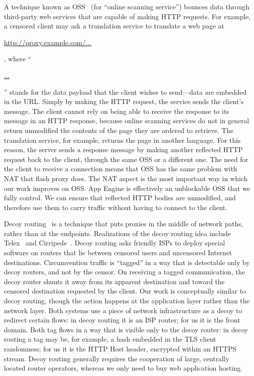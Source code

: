 \documentclass{article}
\begin{document}

A technique known as OSS~\cite{oss} (for
``online scanning service'') bounces data
through third-party web services that are capable of making HTTP requests.
For example, a censored client may ask a translation service to
translate a web page at \begin{NoHyper}\url{http://proxy.example.com/...}\end{NoHyper},
where ``\begin{NoHyper}\url{...}\end{NoHyper}''
stands for the data payload that the client wishes to send---data are embedded in the URL.
Simply by making the HTTP request, the service sends the client's message.
The client cannot rely on being able to receive the response to its message in an HTTP response,
because online scanning services do not in general
return unmodified the contents of the page they are ordered to retrieve.
The translation service, for example, returns the page in another language.
For this reason, the server sends a response message by making
another reflected HTTP request back to the client, through the same OSS or a different one.
The need for the client to receive a connection means that OSS has the same problem with NAT that flash proxy does.
The NAT aspect is the most important way in which our work improves on OSS.
App Engine is effectively an unblockable OSS that we fully control.
We can ensure that reflected HTTP bodies are unmodified, and therefore use them to carry traffic
without having to connect to the client.

Decoy routing~\cite{decoyrouting} is a technique that puts
proxies in the middle of network paths, rather than at the endpoints.
Realizations of the decoy routing idea include Telex~\cite{telex}
and Cirripede~\cite{cirripede}.
Decoy routing asks friendly ISPs to deploy special software on routers that lie
between censored users and uncensored Internet destinations.
Circumvention traffic is ``tagged'' in a way that is detectable only
by decoy routers, and not by the censor.
On receiving a tagged communication, the decoy router shunts it away from its apparent destination
and toward the censored destination requested by the client.
Our work is conceptually similar to decoy routing,
though the action happens at the application layer rather than the network layer.
Both systems use a piece of network infrastructure as a decoy to redirect certain flows:
in decoy routing it is an ISP router; for us it is the front domain.
Both tag flows in a way that is visible only to the decoy router:
in decoy routing a tag may be, for example, a hash embedded in the TLS client randomness;
for us it is the HTTP Host header, encrypted within an HTTPS stream.
Decoy routing generally requires the cooperation of large, centrally located
router operators,
whereas we only need to buy web application hosting.
\end{document}
